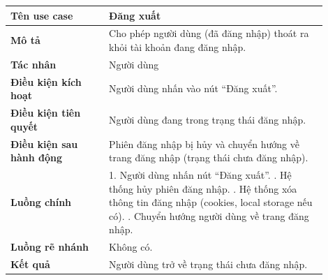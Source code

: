 \begin{table}[H]
\centering
\begin{tabular}{|p{0.28\linewidth}|p{0.62\linewidth}|}
\hline
\textbf{Tên use case} & Đăng xuất \\ \hline

\textbf{Mô tả} & 
Cho phép người dùng (đã đăng nhập) thoát ra khỏi tài khoản đang đăng nhập. \\ \hline

\textbf{Tác nhân} & Người dùng \\ \hline

\textbf{Điều kiện kích hoạt} &
Người dùng nhấn vào nút “Đăng xuất”. \\ \hline

\textbf{Điều kiện tiên quyết} &
Người dùng đang trong trạng thái đăng nhập. \\ \hline

\textbf{Điều kiện sau hành động} &
Phiên đăng nhập bị hủy và chuyển hướng về trang đăng nhập (trạng thái chưa đăng nhập). \\ \hline

\textbf{Luồng chính} &
1. Người dùng nhấn nút “Đăng xuất”. \newline
2. Hệ thống hủy phiên đăng nhập. \newline
3. Hệ thống xóa thông tin đăng nhập (cookies, local storage nếu có). \newline
4. Chuyển hướng người dùng về trang đăng nhập. \\ \hline

\textbf{Luồng rẽ nhánh} &
Không có. \\ \hline

\textbf{Kết quả} &
Người dùng trở về trạng thái chưa đăng nhập. \\ \hline
\end{tabular}
\end{table}

